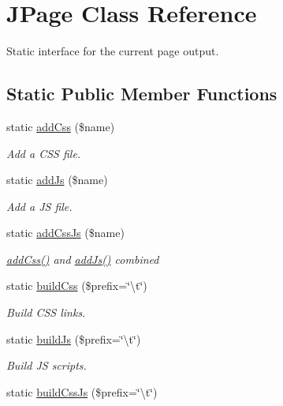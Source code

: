 \hypertarget{classJPage}{\section{J\-Page Class Reference}
\label{classJPage}
}


Static interface for the current page output.  


\subsection*{Static Public Member Functions}
\begin{DoxyCompactItemize}
\item 
\hypertarget{classJPage_a830a3d38ee75a9c42c5f14d6c5853174}{static \hyperlink{classJPage_a830a3d38ee75a9c42c5f14d6c5853174}{add\-Css} (\$name)}\label{classJPage_a830a3d38ee75a9c42c5f14d6c5853174}

\begin{DoxyCompactList}\small\item\em Add a C\-S\-S file. \end{DoxyCompactList}\item 
\hypertarget{classJPage_a53f245f368acaf09896a3307f0bed863}{static \hyperlink{classJPage_a53f245f368acaf09896a3307f0bed863}{add\-Js} (\$name)}\label{classJPage_a53f245f368acaf09896a3307f0bed863}

\begin{DoxyCompactList}\small\item\em Add a J\-S file. \end{DoxyCompactList}\item 
\hypertarget{classJPage_a36a0da1c623f621c8a49129ceb697bdb}{static \hyperlink{classJPage_a36a0da1c623f621c8a49129ceb697bdb}{add\-Css\-Js} (\$name)}\label{classJPage_a36a0da1c623f621c8a49129ceb697bdb}

\begin{DoxyCompactList}\small\item\em \hyperlink{classJPage_a830a3d38ee75a9c42c5f14d6c5853174}{add\-Css()} and \hyperlink{classJPage_a53f245f368acaf09896a3307f0bed863}{add\-Js()} combined \end{DoxyCompactList}\item 
static \hyperlink{classJPage_a4afc4f7b229e35977c4f9908b8363dcc}{build\-Css} (\$prefix=\char`\"{}\textbackslash{}t\char`\"{})
\begin{DoxyCompactList}\small\item\em Build C\-S\-S links. \end{DoxyCompactList}\item 
static \hyperlink{classJPage_ab87eaf4dc5fd15dd14e3b9d35734a7f4}{build\-Js} (\$prefix=\char`\"{}\textbackslash{}t\char`\"{})
\begin{DoxyCompactList}\small\item\em Build J\-S scripts. \end{DoxyCompactList}\item 
\hypertarget{classJPage_aadd9f59c4a932e23d1299250921e1991}{static \hyperlink{classJPage_aadd9f59c4a932e23d1299250921e1991}{build\-Css\-Js} (\$prefix=\char`\"{}\textbackslash{}t\char`\"{})}\label{classJPage_aadd9f59c4a932e23d1299250921e1991}


\end{DoxyCompactItemize}
